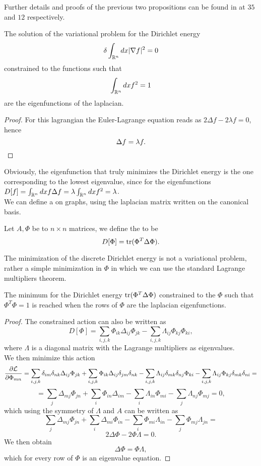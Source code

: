 \documentclass[../2.tex]{subfiles}
\begin{document}
Further details and proofs of the previous two propositions can be found in \cite{fomin} at $35$ and $12$ respectively.

\begin{prop}
    The solution of the variational problem for the Dirichlet energy
    \[ \delta\int_{\mathbb{R}^n} dx | \nabla f |^2 = 0 \]
    constrained to the functions such that 
    \[ \int_{\mathbb{R}^n} dx f^2 = 1 \]
    are the eigenfunctions of the laplacian.
\end{prop}
\begin{proof}
    For this lagrangian the Euler-Lagrange equation reads as $ 2 \Delta f - 2\lambda f = 0$,
    hence 
    \[ \Delta f = \lambda f . \qedhere \]

\end{proof}

Obviously, the eigenfunction that truly minimizes the Dirichlet energy is the one corresponding to the lowest eigenvalue,
since for the eigenfunctions $D[f] = \int_{\mathbb{R}^n} dx f \Delta f = \lambda \int_{\mathbb{R}^n} dx f^2 = \lambda$.
\hfill \\
We can define a  on graphs, using the laplacian matrix written on the canonical basis.

\begin{defn}
    Let $A,\Phi$ be to $n\times n$ matrices, we define the  to be 
    \[ D[\Phi] = \operatorname{tr}(\Phi^T \Delta \Phi). \]
\end{defn}

The minimization of the discrete Dirichlet energy is not a variational problem, rather a simple minimization in $\Phi$ in which we can 
use the standard Lagrange multipliers theorem.

\begin{prop}
    The minimum for the Dirichlet energy $ \operatorname{tr}(\Phi^T \Delta \Phi)$ constrained to the $\Phi$ such that $\Phi^T \Phi = 1$ is reached when the
    rows of $\Phi$ are the laplacian eigenfunctions.
\end{prop}
\begin{proof}
    The constrained action can also be written as
    \[ D[\Phi] = \sum_{i,j,k} \Phi_{ik} \Delta_{ij} \Phi_{jk} - \sum_{i,j,k} \Lambda_{ij} \Phi_{kj} \Phi_{ki}, \]
    where $\Lambda$ is a diagonal matrix with the Lagrange multipliers as eigenvalues.\\ We then minimize this action 
    \[ \frac{\partial \mathcal{L}}{\partial \Phi_{mn}} = \sum_{i,j,k} \delta_{im}\delta_{nk}\Delta_{ij} \Phi_{jk} + \sum_{i,j,k} \Phi_{ik} \Delta_{ij}\delta_{jm}\delta_{nk}
    - \sum_{i,j,k} \Lambda_{ij} \delta_{mk}\delta_{nj}\Phi_{ki} - \sum_{i,j,k} \Lambda_{ij} \Phi_{kj} \delta_{mk}\delta_{ni} =  \]
    \[ = \sum_{j} \Delta_{mj} \Phi_{jn} + \sum_{i} \Phi_{in} \Delta_{im} - \sum_{i} \Lambda_{in} \Phi_{mi} - \sum_{j} \Lambda_{nj} \Phi_{mj} = 0, \]
    which using the symmetry of $\Lambda$ and $A$ can be written as
    \[ \sum_{j} \Delta_{mj} \Phi_{jn} + \sum_{i}  \Delta_{mi} \Phi_{in} - \sum_{i} \Phi_{mi}\Lambda_{in} - \sum_{j} \Phi_{mj} \Lambda_{jn} =  \]
    \[ 2\Delta\Phi - 2\Phi\Lambda = 0. \]
    We then obtain 
    \[ \Delta\Phi = \Phi\Lambda, \]
    which for every row of $\Phi$ is an eigenvalue equation. \qedhere
\end{proof}

    
\end{document}

